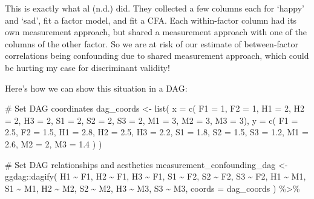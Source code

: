 \documentclass[
  letterpaper,
  DIV=11,
  numbers=noendperiod]{scrreprt}
\newenvironment{Shaded}{\begin{snugshade}}{\end{snugshade}}
\newcommand{\AttributeTok}[1]{\textcolor[rgb]{0.40,0.45,0.13}{#1}}
\newcommand{\CommentTok}[1]{\textcolor[rgb]{0.37,0.37,0.37}{#1}}
\newcommand{\DecValTok}[1]{\textcolor[rgb]{0.68,0.00,0.00}{#1}}
\newcommand{\FloatTok}[1]{\textcolor[rgb]{0.68,0.00,0.00}{#1}}
\newcommand{\FunctionTok}[1]{\textcolor[rgb]{0.28,0.35,0.67}{#1}}
\newcommand{\NormalTok}[1]{\textcolor[rgb]{0.00,0.23,0.31}{#1}}
\newcommand{\OtherTok}[1]{\textcolor[rgb]{0.00,0.23,0.31}{#1}}
\newcommand{\SpecialCharTok}[1]{\textcolor[rgb]{0.37,0.37,0.37}{#1}}
\begin{document}
This is exactly what al (n.d.) did. They collected a few columns each
for `happy' and `sad', fit a factor model, and fit a CFA. Each
within-factor column had its own measurement approach, but shared a
measurement approach with one of the columns of the other factor. So we
are at risk of our estimate of between-factor correlations being
confounding due to shared measurement approach, which could be hurting
my case for discriminant validity!

Here's how we can show this situation in a DAG:

\begin{Shaded}
\begin{Highlighting}[]
\CommentTok{\# Set DAG coordinates}
\NormalTok{dag\_coords }\OtherTok{\textless{}{-}} \FunctionTok{list}\NormalTok{(}
  \AttributeTok{x =} \FunctionTok{c}\NormalTok{(}
    \AttributeTok{F1 =} \DecValTok{1}\NormalTok{, }
    \AttributeTok{F2 =} \DecValTok{1}\NormalTok{,}
    \AttributeTok{H1 =} \DecValTok{2}\NormalTok{,}
    \AttributeTok{H2 =} \DecValTok{2}\NormalTok{,}
    \AttributeTok{H3 =} \DecValTok{2}\NormalTok{,}
    \AttributeTok{S1 =} \DecValTok{2}\NormalTok{,}
    \AttributeTok{S2 =} \DecValTok{2}\NormalTok{,}
    \AttributeTok{S3 =} \DecValTok{2}\NormalTok{,}
    \AttributeTok{M1 =} \DecValTok{3}\NormalTok{,}
    \AttributeTok{M2 =} \DecValTok{3}\NormalTok{,}
    \AttributeTok{M3 =} \DecValTok{3}\NormalTok{),}
  \AttributeTok{y =} \FunctionTok{c}\NormalTok{(}
    \AttributeTok{F1 =} \FloatTok{2.5}\NormalTok{,}
    \AttributeTok{F2 =} \FloatTok{1.5}\NormalTok{,}
    \AttributeTok{H1 =} \FloatTok{2.8}\NormalTok{,}
    \AttributeTok{H2 =} \FloatTok{2.5}\NormalTok{,}
    \AttributeTok{H3 =} \FloatTok{2.2}\NormalTok{,}
    \AttributeTok{S1 =} \FloatTok{1.8}\NormalTok{,}
    \AttributeTok{S2 =} \FloatTok{1.5}\NormalTok{,}
    \AttributeTok{S3 =} \FloatTok{1.2}\NormalTok{,}
    \AttributeTok{M1 =} \FloatTok{2.6}\NormalTok{,}
    \AttributeTok{M2 =} \DecValTok{2}\NormalTok{,}
    \AttributeTok{M3 =} \FloatTok{1.4}
\NormalTok{  )}
\NormalTok{)}

\CommentTok{\# Set DAG relationships and aesthetics}
\NormalTok{measurement\_confounding\_dag }\OtherTok{\textless{}{-}}\NormalTok{ ggdag}\SpecialCharTok{::}\FunctionTok{dagify}\NormalTok{(}
\NormalTok{  H1 }\SpecialCharTok{\textasciitilde{}}\NormalTok{ F1,}
\NormalTok{  H2 }\SpecialCharTok{\textasciitilde{}}\NormalTok{ F1,}
\NormalTok{  H3 }\SpecialCharTok{\textasciitilde{}}\NormalTok{ F1,}
\NormalTok{  S1 }\SpecialCharTok{\textasciitilde{}}\NormalTok{ F2,}
\NormalTok{  S2 }\SpecialCharTok{\textasciitilde{}}\NormalTok{ F2,}
\NormalTok{  S3 }\SpecialCharTok{\textasciitilde{}}\NormalTok{ F2,}
\NormalTok{  H1 }\SpecialCharTok{\textasciitilde{}}\NormalTok{ M1,}
\NormalTok{  S1 }\SpecialCharTok{\textasciitilde{}}\NormalTok{ M1,}
\NormalTok{  H2 }\SpecialCharTok{\textasciitilde{}}\NormalTok{ M2,}
\NormalTok{  S2 }\SpecialCharTok{\textasciitilde{}}\NormalTok{ M2,}
\NormalTok{  H3 }\SpecialCharTok{\textasciitilde{}}\NormalTok{ M3,}
\NormalTok{  S3 }\SpecialCharTok{\textasciitilde{}}\NormalTok{ M3,}
  \AttributeTok{coords =}\NormalTok{ dag\_coords}
\NormalTok{) }\SpecialCharTok{\%\textgreater{}\%} 
  

\end{Highlighting}
\end{Shaded}
\end{document}
